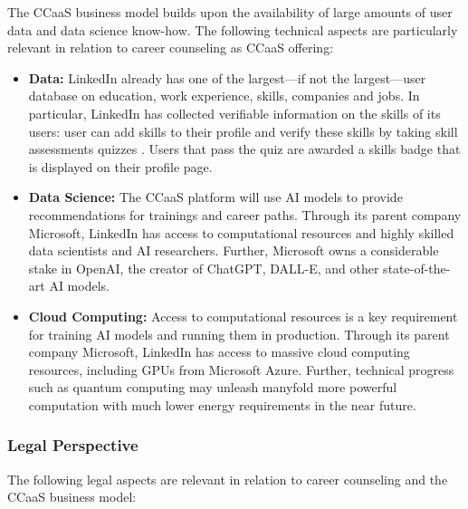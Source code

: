 The CCaaS business model builds upon the availability of large amounts of user data and data science know-how.
The following technical aspects are particularly relevant in relation to career counseling as CCaaS offering:

\begin{itemize}
    \item \textbf{Data:} LinkedIn already has one of the largest---if not the largest---user database 
        on education, work experience, skills, companies and jobs. In particular, LinkedIn has collected
        verifiable information on the skills of its users: user can add skills to their profile and
        verify these skills by taking skill assessments quizzes \citep{kaserAIpoweredCareerCounseling2023}.
        Users that pass the quiz are awarded a skills badge that is displayed on their profile page.
    \item \textbf{Data Science:} The CCaaS platform will use AI models to provide
        recommendations for trainings and career paths. Through its parent company Microsoft,
        LinkedIn has access to computational resources and highly skilled data scientists and AI 
        researchers. Further, Microsoft owns a considerable stake in OpenAI, the creator of 
        ChatGPT, DALL-E, and other state-of-the-art AI models.
    \item \textbf{Cloud Computing:} Access to computational resources is a key requirement for training
        AI models and running them in production. Through its parent company Microsoft, LinkedIn has
        access to massive cloud computing resources, including GPUs from Microsoft Azure. Further,
        technical progress such as quantum computing may unleash manyfold more powerful computation 
        with much lower energy requirements in the near future.
\end{itemize}


\subsubsection{Legal Perspective}

The following legal aspects are relevant in relation to career counseling and the CCaaS business model:

